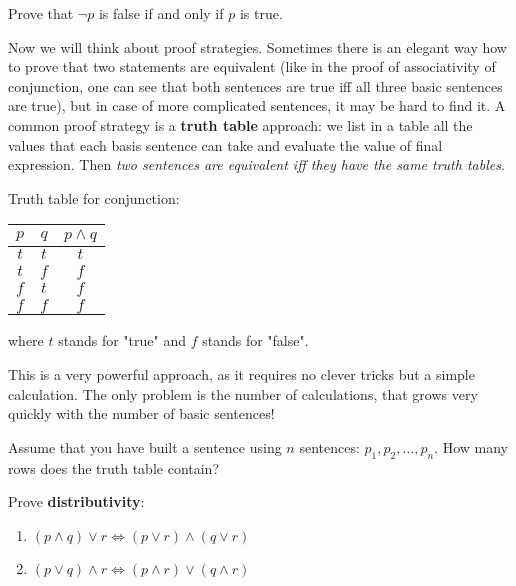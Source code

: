 \begin{exercise}
  Prove that $\neg p$ is false if and only if $p$ is true.
\end{exercise}

Now we will think about proof strategies. Sometimes there is an elegant way how to prove that two statements are equivalent (like in the proof of associativity of
conjunction, one can see that both sentences are true iff all three basic sentences are true), but in case of more complicated sentences, it may be hard to find it. A common
proof strategy is a \textbf{truth table} approach: we list in a table all the values that each basis sentence can take and evaluate the value of final expression.
Then \textit{two sentences are equivalent iff they have the same truth tables}.

\begin{example}
  Truth table for conjunction:\\
  \begin{center}
    \begin{tabular}{ c  c  c }
      $p$ & $q$ & $p\wedge q$ \\
      \hline
      $t$  &  $t$ &   $t$     \\
      $t$  &  $f$ &   $f$     \\
      $f$  &  $t$ &   $f$     \\
      $f$  &  $f$ &   $f$     \\
    \end{tabular}
  \end{center}
  where $t$ stands for "true" and $f$ stands for "false".
\end{example}

This is a very powerful approach, as it requires no clever tricks but a simple calculation. The only problem is the number of calculations, that grows very quickly with
the number of basic sentences!

\begin{exercise}
  Assume that you have built a sentence using $n$ sentences: $p_1, p_2, \dots, p_n$. How many rows does the truth table contain?
\end{exercise}

\begin{exercise}
  Prove \textbf{distributivity}:
  \begin{enumerate}
    \item $(p\wedge q)\vee r \Leftrightarrow (p\vee r) \wedge (q\vee r)$
    \item $(p\vee q)\wedge r \Leftrightarrow (p\wedge r) \vee (q\wedge r)$
  \end{enumerate}
\end{exercise}

